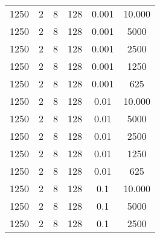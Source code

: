 \begin{tabularx}{\linewidth}{ |c|c|c|c|c|c|  }
    \hline
    1250 & 2   & 8     & 128 & 0.001 & 10.000                                                                                                                             \\
    1250 & 2   & 8     & 128 & 0.001 & 5000                                                                                                                               \\
    1250 & 2   & 8     & 128 & 0.001 & 2500                                                                                                                               \\
    1250 & 2   & 8     & 128 & 0.001 & 1250                                                                                                                               \\
    1250 & 2   & 8     & 128 & 0.001 & 625                                                                                                                                \\
    1250 & 2   & 8     & 128 & 0.01  & 10.000                                                                                                                             \\
    1250 & 2   & 8     & 128 & 0.01  & 5000                                                                                                                               \\
    1250 & 2   & 8     & 128 & 0.01  & 2500                                                                                                                               \\
    1250 & 2   & 8     & 128 & 0.01  & 1250                                                                                                                               \\
    1250 & 2   & 8     & 128 & 0.01  & 625                                                                                                                                \\
    1250 & 2   & 8     & 128 & 0.1   & 10.000                                                                                                                             \\
    1250 & 2   & 8     & 128 & 0.1   & 5000                                                                                                                               \\
    1250 & 2   & 8     & 128 & 0.1   & 2500                                                                                                                               \\

\end{tabularx}
